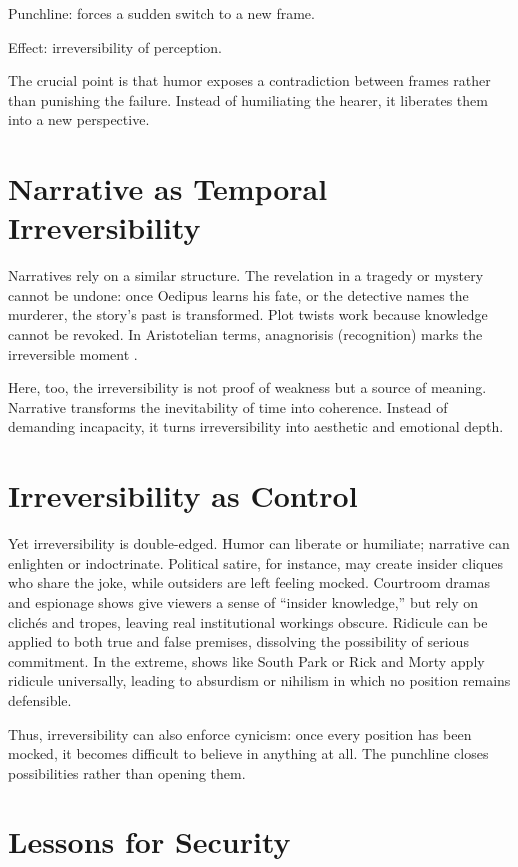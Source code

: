 \documentclass{book}
\begin{document}
Punchline: forces a sudden switch to a new frame.

Effect: irreversibility of perception.

The crucial point is that humor exposes a contradiction between frames rather than punishing the failure. Instead of humiliating the hearer, it liberates them into a new perspective.

\section{Narrative as Temporal Irreversibility}

Narratives rely on a similar structure. The revelation in a tragedy or mystery cannot be undone: once Oedipus learns his fate, or the detective names the murderer, the story’s past is transformed. Plot twists work because knowledge cannot be revoked. In Aristotelian terms, anagnorisis (recognition) marks the irreversible moment \cite{ortega1935}.

Here, too, the irreversibility is not proof of weakness but a source of meaning. Narrative transforms the inevitability of time into coherence. Instead of demanding incapacity, it turns irreversibility into aesthetic and emotional depth.

\section{Irreversibility as Control}

Yet irreversibility is double-edged. Humor can liberate or humiliate; narrative can enlighten or indoctrinate. Political satire, for instance, may create insider cliques who share the joke, while outsiders are left feeling mocked. Courtroom dramas and espionage shows give viewers a sense of ``insider knowledge,'' but rely on clichés and tropes, leaving real institutional workings obscure. Ridicule can be applied to both true and false premises, dissolving the possibility of serious commitment. In the extreme, shows like South Park or Rick and Morty apply ridicule universally, leading to absurdism or nihilism in which no position remains defensible.

Thus, irreversibility can also enforce cynicism: once every position has been mocked, it becomes difficult to believe in anything at all. The punchline closes possibilities rather than opening them.

\section{Lessons for Security}
\end{document}
